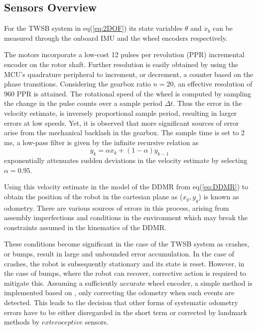     \subsection{Sensors Overview}
        For the TWSB system in eq(\ref{eq:2DOF}) its state variables $\theta$ and $\dot x_b$ can be measured through the onboard IMU 
        and the wheel encoders respectively. 
            
        The motors incorporate a low-cost 12 pulses per revolution (PPR) incremental encoder on the rotor shaft. 
        Further resolution is easily obtained by using the MCU's quadrature 
        peripheral to increment, or decrement, a counter based on the phase transitions.
        Considering the gearbox ratio $n=20$, an effective resolution of 960 PPR is attained.
        The rotational speed of the wheel is computed by sampling the change in the pulse counts
        over a sample period $\Delta t$. Thus the error in the velocity estimate, 
        is inversely proportional sample period, resulting in larger errors at low speeds.
        Yet, it is observed that more significant sources of error arise from the mechanical backlash in the gearbox.
        The sample time is set to 2 ms, a low-pass filter is given by the infinite recursive relation as
        \begin{equation}
            y_k = \alpha x_k + (1-\alpha)y_{k-1}
            \label{eq:lpf}
        \end{equation}
        exponentially attenuates sudden deviations in the velocity estimate by selecting $\alpha = 0.95$.

        Using this velocity estimate in the model of the DDMR from eq(\ref{eq:DDMR}) to obtain the
        position of the robot in the cartesian plane as ($x_g,y_g$) is known as odometry.
        There are various sources of errors in 
        this process, arising from assembly imperfections and conditions in 
        the environment which may break the constraints assumed in the kinematics of the DDMR.
            
        These conditions become significant in the case of the TWSB system as crashes, or bumps, result in large 
        and unbounded error accumulation. In the case of crashes, the robot is subsequently stationary 
        and its state is reset. However, in the case of bumps, where the robot can recover, corrective 
        action is required to mitigate this. Assuming a sufficiently accurate wheel encoder, a simple method is 
        implemented based on \cite{Gyrodometry}, only correcting 
        the odometry when such events are detected.  
        This leads to the decision that other forms of systematic odometry errors have to be 
        either disregarded in the short term or corrected by landmark methods by $exteroceptive$ sensors. 

